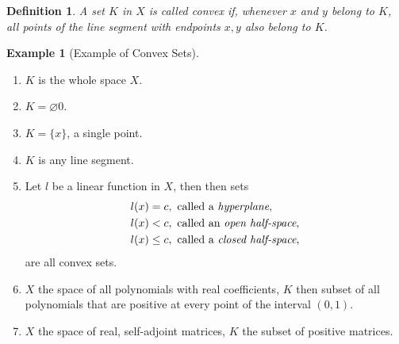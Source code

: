 \documentclass[11pt]{book}
\newtheorem{definition}{Definition}[section]
\theoremstyle{definition}
\newtheorem{example}{Example}[section]
\numberwithin{equation}{chapter}
\begin{document}
\medskip

\begin{definition}
A set $K$ in $X$ is called convex if, whenever $x$ and $y$ belong to $K$, all points of the line segment with endpoints $x, y$ also belong to $K$.
\end{definition}

\medskip

\begin{example}[Example of Convex Sets]
~\begin{enumerate}[label=(\arabic*)]
    \item $K$ is the whole space $X$.
    
    \item $K = \varnothing0$.
    
    \item $K = \{x\}$, a single point.
    
    \item $K$ is any line segment.
    
    \item Let $l$ be a linear function in $X$, then then sets 
    \begin{align*}
        l(x) & = c, \,\,\text{called a {\em hyperplane}}, \\
        l(x) & < c, \,\,\text{called an {\em open half-space}}, \\
        l(x) & \leq c, \,\,\text{called a {\em closed half-space}},
    \end{align*}
    are all convex sets.
    
    \item $X$ the space of all polynomials with real coefficients, $K$ then subset of all polynomials that are positive at every point of the interval $(0,1)$.
    
    \item $X$ the space of real, self-adjoint matrices, $K$ the subset of positive matrices.
\end{enumerate}
\end{example}

\medskip
\end{document}

